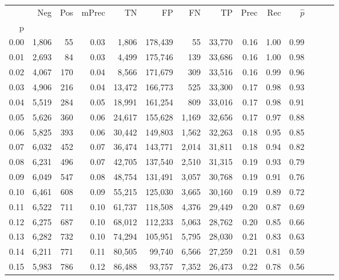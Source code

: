 \begin{tabular}{rrrrrrrrrrrrrr}
\toprule
{} &    Neg &  Pos & mPrec &       TN &       FP &      FN &      TP &  Prec &   Rec & $\hat{p}$ \\
p    &        &      &       &          &          &         &         &       &       &           \\
\midrule
0.00 &  1,806 &   55 &  0.03 &    1,806 &  178,439 &      55 &  33,770 &  0.16 &  1.00 &      0.99 \\
0.01 &  2,693 &   84 &  0.03 &    4,499 &  175,746 &     139 &  33,686 &  0.16 &  1.00 &      0.98 \\
0.02 &  4,067 &  170 &  0.04 &    8,566 &  171,679 &     309 &  33,516 &  0.16 &  0.99 &      0.96 \\
0.03 &  4,906 &  216 &  0.04 &   13,472 &  166,773 &     525 &  33,300 &  0.17 &  0.98 &      0.93 \\
0.04 &  5,519 &  284 &  0.05 &   18,991 &  161,254 &     809 &  33,016 &  0.17 &  0.98 &      0.91 \\
0.05 &  5,626 &  360 &  0.06 &   24,617 &  155,628 &   1,169 &  32,656 &  0.17 &  0.97 &      0.88 \\
0.06 &  5,825 &  393 &  0.06 &   30,442 &  149,803 &   1,562 &  32,263 &  0.18 &  0.95 &      0.85 \\
0.07 &  6,032 &  452 &  0.07 &   36,474 &  143,771 &   2,014 &  31,811 &  0.18 &  0.94 &      0.82 \\
0.08 &  6,231 &  496 &  0.07 &   42,705 &  137,540 &   2,510 &  31,315 &  0.19 &  0.93 &      0.79 \\
0.09 &  6,049 &  547 &  0.08 &   48,754 &  131,491 &   3,057 &  30,768 &  0.19 &  0.91 &      0.76 \\
0.10 &  6,461 &  608 &  0.09 &   55,215 &  125,030 &   3,665 &  30,160 &  0.19 &  0.89 &      0.72 \\
0.11 &  6,522 &  711 &  0.10 &   61,737 &  118,508 &   4,376 &  29,449 &  0.20 &  0.87 &      0.69 \\
0.12 &  6,275 &  687 &  0.10 &   68,012 &  112,233 &   5,063 &  28,762 &  0.20 &  0.85 &      0.66 \\
0.13 &  6,282 &  732 &  0.10 &   74,294 &  105,951 &   5,795 &  28,030 &  0.21 &  0.83 &      0.63 \\
0.14 &  6,211 &  771 &  0.11 &   80,505 &   99,740 &   6,566 &  27,259 &  0.21 &  0.81 &      0.59 \\
0.15 &  5,983 &  786 &  0.12 &   86,488 &   93,757 &   7,352 &  26,473 &  0.22 &  0.78 &      0.56 \\

\end{tabular}
